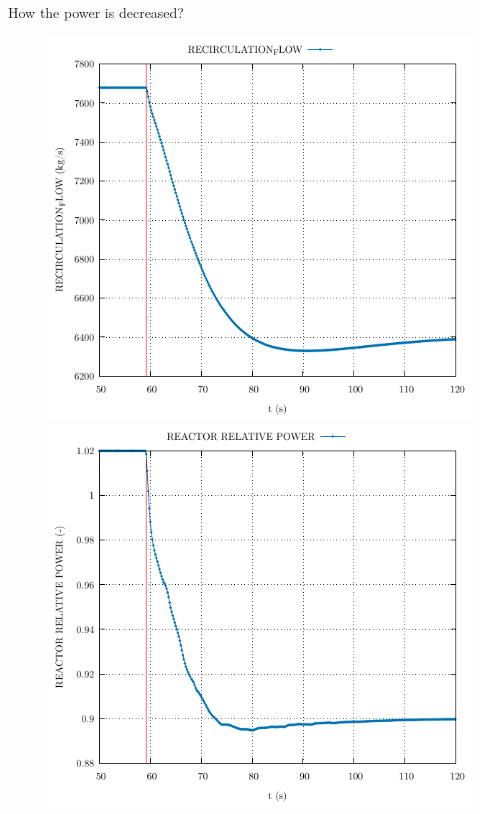 \begin{frame}{How the power is decreased?}
	\begin{figure}
		\centering
		\begin{minipage}{.5\textwidth}
			\centering
			\includegraphics[width=\linewidth]{./graphs/RECIRCULATION_FLOW_comp.pdf}
		\end{minipage}%
		\begin{minipage}{.5\textwidth}
			\centering
			\includegraphics[width=\linewidth]{./graphs/REACTOR RELATIVE POWER_comp.pdf}

\end{minipage}
\end{figure}
\end{frame}
